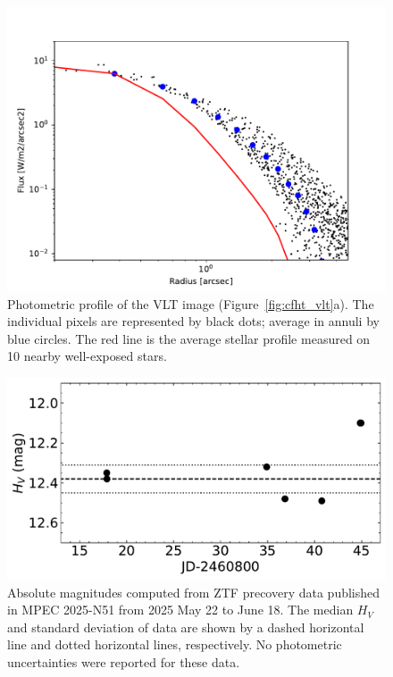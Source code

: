 \documentclass[twocolumn,longbib]{aastex7}
\begin{document}
\begin{CJK*}{UTF8}{gbsn}
\begin{figure}
    \includegraphics[width=1.\linewidth]{static/3I_profile.pdf}
\caption{Photometric profile of the VLT image (Figure~\ref{fig:cfht_vlt}a). The individual pixels are represented by black dots; average in annuli by blue circles. The red line is the average stellar profile measured on 10 nearby well-exposed stars.
}
\label{fig:vlt_profile}
\end{figure}

\begin{figure}
    \includegraphics[width=1.\linewidth]{static/fig_ztf_secular_lc.pdf}
    \caption{Absolute magnitudes computed from ZTF precovery data published in MPEC 2025-N51 from 2025 May 22 to June 18.  The median $H_V$ and standard deviation of data  are shown by a dashed horizontal line and dotted horizontal lines, respectively. No photometric uncertainties were reported for these data.}
\label{fig:ztf_secular}
\end{figure}


\end{CJK*}
\end{document}
